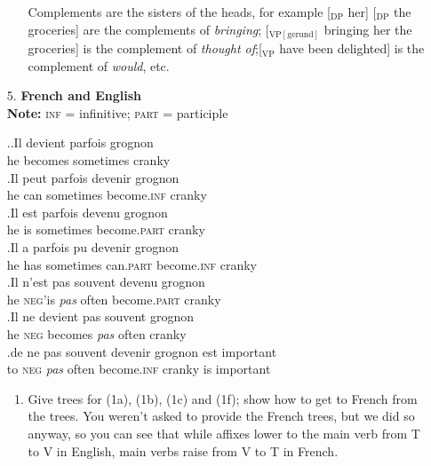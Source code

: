 \documentclass[a4paper,12pt]{article}
\newcommand{\lbl}[1]{\ensuremath{_{\scriptstyle\mathrm{#1}}}}
\begin{document}
\begin{enumerate}
\begin{enumerate}[label=(\roman*)]
Complements are the sisters of the heads, for example [\lbl{DP} her] [\lbl{DP} the groceries] are the complements of \textit{bringing}; [\lbl{VP[gerund]} bringing her the groceries] is the complement of \textit{thought of};[\lbl{VP} have been delighted] is the complement of \textit{would}, etc.
      \end{enumerate}

   \item[5.]\textbf{French and English}\\
    \noindent\textbf{Note:} \textsc{inf} = infinitive; \textsc{part} = participle
    \setcounter{ExNo}{0}

    	\ex.\ag.Il devient parfois grognon\\
              he becomes sometimes cranky\\
          \bg.Il peut parfois devenir grognon\\
              he can sometimes become.\textsc{inf} cranky\\
          \bg.Il est parfois devenu grognon\\
              he is sometimes become.\textsc{part} cranky\\
          \bg.Il a parfois pu devenir grognon\\
              he has sometimes can.\textsc{part} become.\textsc{inf} cranky\\
          \bg.Il n'est pas souvent devenu grognon\\
              he \textsc{neg}'is \textit{pas} often become.\textsc{part} cranky\\
          \bg.Il ne devient pas souvent grognon\\
              he \textsc{neg} becomes \textit{pas} often cranky\\
          \bg.de ne pas souvent devenir grognon est important\\
              to \textsc{neg} \textit{pas} often become.\textsc{inf} cranky is important\\

    	\begin{enumerate}[label=(\roman*)]
        	\item Give trees for (1a), (1b), (1c) and (1f); show how to get to French from the trees. You weren't asked to provide the French trees, but we did so anyway, so you can see that while affixes lower to the main verb from T to V in English, main verbs raise from V to T in French.    
      

\end{enumerate}
\end{enumerate}
\end{document}

